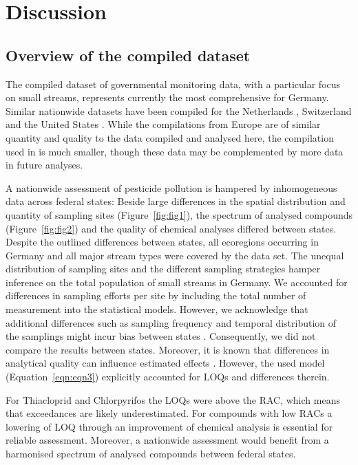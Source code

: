 \documentclass[journal=esthag,manuscript=article]{achemso}
\begin{document}
\section{Discussion}
\subsection{Overview of the compiled dataset}
The compiled dataset of governmental monitoring data, with a particular focus on small streams, represents currently the most comprehensive for Germany.
Similar nationwide datasets have been compiled for the Netherlands \citep{vijver_spatial_2008}, Switzerland \citep{munz_pestizidmessungen_2011} and the United States \citep{stone2014pesticides}.
While the compilations from Europe are of similar quantity and quality to the  data compiled and analysed here, the compilation used in \citet{stone2014pesticides} is much smaller, though these data may be complemented by more data in future analyses. 

A nationwide assessment of pesticide pollution is hampered by inhomogeneous data across federal states:
Beside large differences in the spatial distribution and quantity of sampling sites (Figure~\ref{fig:fig1}), the spectrum of analysed compounds (Figure~\ref{fig:fig2}) and the quality of chemical analyses differed between states. 
Despite the outlined differences between states, all ecoregions occurring in Germany \citep{illies1978limnofauna,abell2008freshwater} and all major stream types were covered by the data set.
The unequal distribution of sampling sites and the different sampling strategies hamper inference on the total population of small streams in Germany.
We accounted for differences in sampling efforts per site by including the total number of measurement into the statistical models. 
However, we acknowledge that additional differences such as sampling frequency and temporal distribution of the samplings might incur bias between states  \citep{stehle_probabilistic_2013,Xing_Chow_Rees_Meng_Li_Ernst_Benoy_Zha_Hewitt_2013}. 
Consequently, we did not compare the results between states.
Moreover, it is known that differences in analytical quality can influence estimated effects \citep{Martin_Eberle_Nakagaki, Schreiner_Szocs_Bhowmik_Vijver_Schafer_2016}.
However, the used model (Equation~\ref{eqn:eqn3}) explicitly accounted for LOQs and differences therein. 

For Thiacloprid and Chlorpyrifos the LOQs were above the RAC, which means that exceedances are likely underestimated.
For compounds with low RACs a lowering of LOQ through an improvement of chemical analysis is essential for reliable assessment.
Moreover, a nationwide assessment would benefit from a harmonised spectrum of analysed compounds between federal states. 
\end{document}

